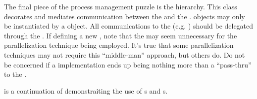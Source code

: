 The final piece of the process management puzzle is the
 hierarchy.  This class decorates and
mediates communication between the  and the .  
 objects may only be instantiated by
a  object.  All communications to the 
(e.g. ) should be delegated through the
.  If defining a new , note
that the  may seem unnecessary for the
parallelization technique being employed.  It's true
that some parallelization techniques may not require this ``middle-man''
approach, but others do.  Do not be concerned if a  implementation ends up being nothing more than a ``pass-thru'' to
the .

 is a continuation of
 demonstraiting the use of s and
s.

